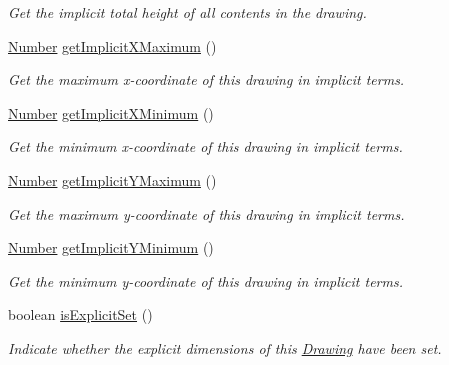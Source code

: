 \begin{DoxyCompactItemize}
\begin{DoxyCompactList}\small\item\em Get the implicit total height of all contents in the drawing. \end{DoxyCompactList}\item 
\hyperlink{interfacecom_1_1aarrelaakso_1_1drawl_1_1_number}{Number} \hyperlink{classcom_1_1aarrelaakso_1_1drawl_1_1_drawing_a5376328fce5b40696338490ab5b65bfe}{get\+Implicit\+X\+Maximum} ()
\begin{DoxyCompactList}\small\item\em Get the maximum x-\/coordinate of this drawing in implicit terms. \end{DoxyCompactList}\item 
\hyperlink{interfacecom_1_1aarrelaakso_1_1drawl_1_1_number}{Number} \hyperlink{classcom_1_1aarrelaakso_1_1drawl_1_1_drawing_a481640a0219881863f0150b5f6439e38}{get\+Implicit\+X\+Minimum} ()
\begin{DoxyCompactList}\small\item\em Get the minimum x-\/coordinate of this drawing in implicit terms. \end{DoxyCompactList}\item 
\hyperlink{interfacecom_1_1aarrelaakso_1_1drawl_1_1_number}{Number} \hyperlink{classcom_1_1aarrelaakso_1_1drawl_1_1_drawing_a604c7e5fd692a279380aa2cd8c47a9bc}{get\+Implicit\+Y\+Maximum} ()
\begin{DoxyCompactList}\small\item\em Get the maximum y-\/coordinate of this drawing in implicit terms. \end{DoxyCompactList}\item 
\hyperlink{interfacecom_1_1aarrelaakso_1_1drawl_1_1_number}{Number} \hyperlink{classcom_1_1aarrelaakso_1_1drawl_1_1_drawing_a6bd98f6bb8616668329f07705f8f3689}{get\+Implicit\+Y\+Minimum} ()
\begin{DoxyCompactList}\small\item\em Get the minimum y-\/coordinate of this drawing in implicit terms. \end{DoxyCompactList}\item 
boolean \hyperlink{classcom_1_1aarrelaakso_1_1drawl_1_1_drawing_ab5e45e49b01dc01733156f2bd3e917ea}{is\+Explicit\+Set} ()
\begin{DoxyCompactList}\small\item\em Indicate whether the explicit dimensions of this \hyperlink{classcom_1_1aarrelaakso_1_1drawl_1_1_drawing}{Drawing} have been set. \end{DoxyCompactList}\item 

\end{DoxyCompactItemize}
